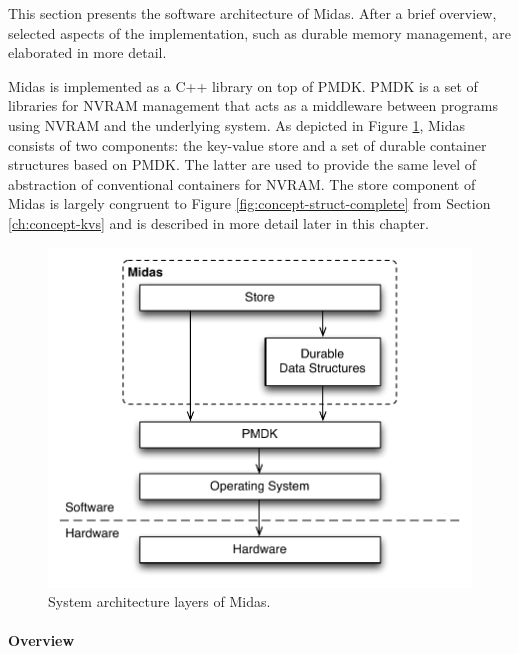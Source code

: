 
This section presents the software architecture of Midas. After a brief
overview, selected aspects of the implementation, such as durable memory management, are elaborated in more detail.

Midas is implemented as a C++ library on top of PMDK. PMDK is a set of libraries
for NVRAM management that acts as a middleware between programs using NVRAM and
the underlying system. As depicted in Figure \ref{fig:impl-arch}, Midas consists
of two components: the key-value store and a set of durable container structures
based on PMDK. The latter are used to provide the same level of abstraction of
conventional containers for NVRAM. The store component of Midas is largely
congruent to Figure \ref{fig:concept-struct-complete} from Section
\ref{ch:concept-kvs} and is described in more detail later in this chapter.

\begin{figure}[h!]
    \centering
    \includegraphics[scale=0.75]{figures/impl/arch2.pdf}
    \caption{System architecture layers of Midas.}
    \label{fig:impl-arch}
\end{figure}

\paragraph{Overview}

